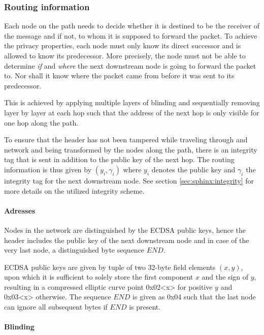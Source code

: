 \subsubsection{Routing information}
\label{sec:sphinx:routinginformation}

Each node on the path needs to decide whether it is destined to be the receiver of the message and if not, to whom it is supposed to forward the packet. To achieve the privacy properties, each node must only know its direct successor and is allowed to know its predecessor. More precisely, the node must not be able to determine \textit{if} and \textit{where} the next downstream node is going to forward the packet to. Nor shall it know where the packet came from before it was sent to its predecessor.

This is achieved by applying multiple layers of blinding and sequentially removing layer by layer at each hop such that the address of the next hop is only visible for one hop along the path.

To ensure that the header has not been tampered while traveling through and network and being transformed by the nodes along the path, there is an integrity tag that is sent in addition to the public key of the next hop. The routing information is thus given by $(y_i, \gamma_i)$ where $y_i$ denotes the public key and $\gamma_i$ the integrity tag for the next downstream node. See section \ref{sec:sphinx:integrity} for more details on the utilized integrity scheme.

\paragraph{Adresses}

Nodes in the network are distinguished by the ECDSA public keys, hence the header includes the public key of the next downstream node and in case of the very last node, a distinguished byte sequence $END$.

ECDSA public keys are given by tuple of two 32-byte field elements $(x,y)$, upon which it is sufficient to solely store the first component $x$ and the sign of $y$, resulting in a \textsf{compressed} elliptic curve point \textsf{0x02}\textless\textsf{x}\textgreater{} for positive $y$ and \textsf{0x03}\textless\textsf{x}\textgreater{} otherwise. The sequence $END$ is given as \textsf{0x04} such that the last node can ignore all subsequent bytes if $END$ is present.

\paragraph{Blinding}


